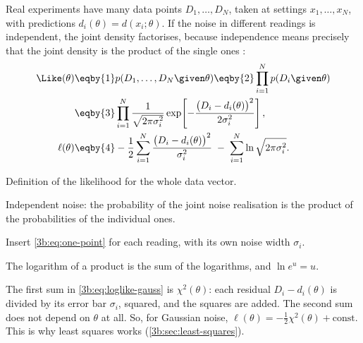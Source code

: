 Real experiments have many data points $D_1,\dots,D_N$, taken at settings
$x_1,\dots,x_N$, with predictions $d_i(\theta)=d(x_i;\theta)$. If the noise
in different readings is independent, the joint density factorises, because
independence means precisely that the joint density is the product of the
single ones :
\begin{align}
  \Like(\theta)
  &\eqby{1} p(D_1,\dots,D_N\given\theta)
   \eqby{2} \prod_{i=1}^N p(D_i\given\theta)
  \nonumber\\
  &\eqby{3} \prod_{i=1}^N\frac{1}{\sqrt{2\pi\sigma_i^2}}
     \exp\!\left[-\frac{\bigl(D_i-d_i(\theta)\bigr)^2}{2\sigma_i^2}\right],
  \label{3b:eq:like-product}\\
  \ell(\theta)
  &\eqby{4} -\frac12\sum_{i=1}^N\frac{\bigl(D_i-d_i(\theta)\bigr)^2}{\sigma_i^2}
   \;-\;\sum_{i=1}^N\ln\sqrt{2\pi\sigma_i^2} .
  \label{3b:eq:loglike-gauss}
\end{align}
\begin{explain}
  \item Definition of the likelihood for the whole data vector.
  \item Independent noise: the probability of the joint noise realisation
        is the product of the probabilities of the individual ones.
  \item Insert \eqref{3b:eq:one-point} for each reading, with its own
        noise width $\sigma_i$.
  \item The logarithm of a product is the sum of the logarithms, and
        $\ln e^{u}=u$.
\end{explain}
The first sum in \eqref{3b:eq:loglike-gauss} is
$\chi^2(\theta)$: each residual $D_i-d_i(\theta)$ is divided by its error
bar $\sigma_i$, squared, and the squares are added. The second sum does not
depend on $\theta$ at all. So, for Gaussian noise,
$\ell(\theta)=-\tfrac12\chi^2(\theta)+\text{const}$. This is why least
squares works (\cref{3b:sec:least-squares}).

